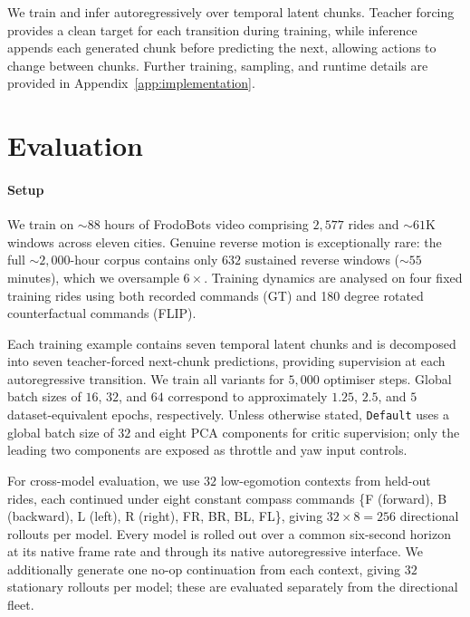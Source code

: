 \documentclass[letterpaper]{article} %
\begin{document}
We train and infer autoregressively over temporal latent chunks. Teacher forcing
provides a clean target for each transition during training, while inference
appends each generated chunk before predicting the next, allowing actions to
change between chunks. Further training, sampling, and runtime details are
provided in Appendix~\ref{app:implementation}.

\section{Evaluation}
\label{sec:eval}

\paragraph{Setup}
We train on ${\sim}88$ hours of FrodoBots video comprising $2{,}577$ rides and ${\sim}61$K windows across eleven cities. Genuine reverse motion is exceptionally rare: the full ${\sim}2{,}000$-hour corpus contains only $632$ sustained reverse windows (${\sim}55$ minutes), which we oversample $6\times$. Training dynamics are analysed on four fixed training rides using both recorded commands (GT) and 180 degree rotated counterfactual commands (FLIP).

Each training example contains seven temporal latent chunks and is decomposed
into seven teacher-forced next-chunk predictions, providing supervision at each
autoregressive transition. We train all variants for $5{,}000$ optimiser steps.
Global batch sizes of $16$, $32$, and $64$ correspond to approximately $1.25$,
$2.5$, and $5$ dataset-equivalent epochs, respectively. Unless otherwise
stated, \texttt{Default} uses a global batch size of $32$ and eight PCA
components for critic supervision; only the leading two components are exposed as throttle and yaw input controls.

For cross-model evaluation, we use $32$ low-egomotion contexts from held-out
rides, each continued under eight constant compass commands
\{F (forward), B (backward), L (left), R (right), FR, BR, BL, FL\}, giving
$32\times8=256$ directional rollouts per model. Every model is rolled out over
a common six-second horizon at its native frame rate and through its native
autoregressive interface. We additionally generate one no-op continuation from
each context, giving $32$ stationary rollouts per model; these are evaluated
separately from the directional fleet.
\end{document}
